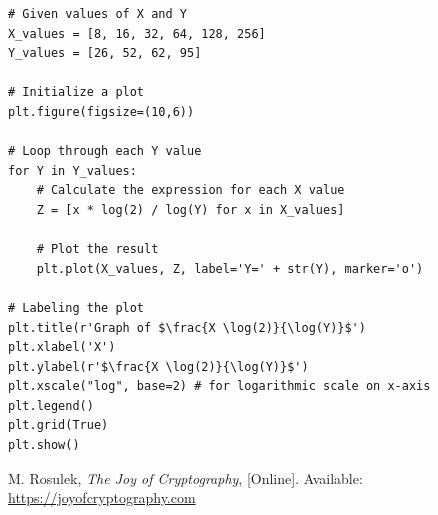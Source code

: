 \documentclass[12pt,openany]{book}
\theoremstyle{definition}
\begin{document}
\begin{itemize}
\begin{lstlisting}[style=sage]
# Given values of X and Y
X_values = [8, 16, 32, 64, 128, 256]
Y_values = [26, 52, 62, 95]

# Initialize a plot
plt.figure(figsize=(10,6))

# Loop through each Y value
for Y in Y_values:
	# Calculate the expression for each X value
	Z = [x * log(2) / log(Y) for x in X_values]
	
	# Plot the result
	plt.plot(X_values, Z, label='Y=' + str(Y), marker='o')

# Labeling the plot
plt.title(r'Graph of $\frac{X \log(2)}{\log(Y)}$')
plt.xlabel('X')
plt.ylabel(r'$\frac{X \log(2)}{\log(Y)}$')
plt.xscale("log", base=2) # for logarithmic scale on x-axis
plt.legend()
plt.grid(True)
plt.show()
\end{lstlisting}
	\end{itemize}

	\begin{thebibliography}{9}
		M. Rosulek, \textit{The Joy of Cryptography}, [Online]. Available: \url{https://joyofcryptography.com}
	\end{thebibliography}

\end{document}
